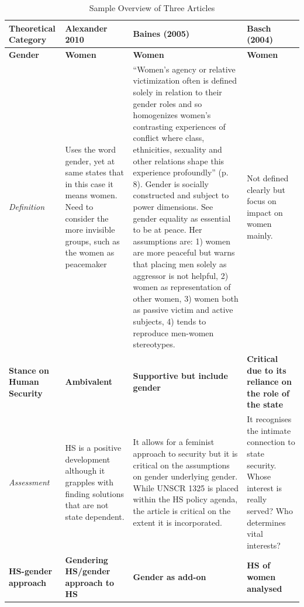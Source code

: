\documentclass[10pt,a4paper]{article}
\begin{document}
\begin{table}[H]
\centering
\begin{footnotesize}
\caption{Sample Overview of Three Articles}
\label{ATab2}
\begin{tabular}{L{3cm} L{4.2cm} L{4.2cm} L{4.2cm}}
\toprule
\textbf{Theoretical Category} & \textbf{Alexander 2010} & \textbf{Baines (2005)} & \textbf{Basch (2004)} \\ \midrule
\textbf{Gender} & \textbf{Women} & \textbf{Women} & \textbf{Women} \\ \midrule
\textit{Definition} & Uses the word gender, yet at same states that in this case it means women. Need to consider the more invisible groups, such as the women as peacemaker & ``Women's agency or relative victimization often is defined solely in relation to their gender roles and so homogenizes women's contrasting experiences of conflict where class, ethnicities, sexuality and other relations shape this experience profoundly'' (p. 8). Gender is socially constructed and subject to power dimensions. See gender equality as essential to be at peace. Her assumptions are: 1) women are more peaceful but warns that placing men solely as aggressor is not helpful, 2) women as representation of other women, 3) women both as passive victim and active subjects, 4) tends to reproduce men-women stereotypes. & Not defined clearly but focus on impact on women mainly. \\ \midrule
\textbf{Stance on Human Security} &\textbf{Ambivalent} & \textbf{Supportive but include gender} & \textbf{Critical due to its reliance on the role of the state} \\ \midrule
\textit{Assessment} & HS is a positive development although it grapples with finding solutions that are not state dependent. & It allows for a feminist approach to security but it is critical on the assumptions on gender underlying gender. While UNSCR 1325 is placed within the HS policy agenda, the article is critical on the extent it is incorporated. & It recognises the intimate connection to state security. Whose interest is really served? Who determines vital interests? \\ \midrule
\textbf{HS-gender approach} & \textbf{Gendering HS/gender approach to HS} & \textbf{Gender as add-on} & \textbf{HS of women analysed} \\ \midrule

\end{tabular}
\end{footnotesize}
\end{table}
\end{document}
